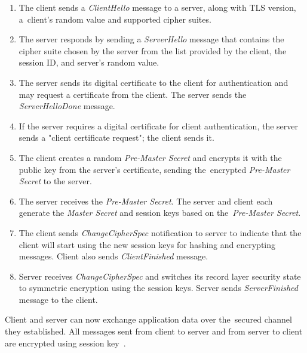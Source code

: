 \documentclass[
  oneside, 12pt, 
  printed, %
  notable,   %
  nolof,     %
  nolot,     %
]{fithesis3}
\begin{document}
\begin{enumerate}
\item The client sends a \textit{ClientHello} message to a server, along with TLS version, a~client's random value and supported cipher suites.
\item The server responds by sending a \textit{ServerHello} message that contains the cipher suite chosen by the server from the list provided by the client, the session ID, and server's random value. 
\item The server sends its digital certificate to the client for authentication and may request a certificate from the client. The server sends the \textit{ServerHelloDone} message.
\item If the server requires a digital certificate for client authentication, the server sends a "client certificate request"; the client sends it.
\item The client creates a random \textit{Pre-Master Secret} and encrypts it with the public key from the server's certificate, sending the~encrypted \textit{Pre-Master Secret} to the server.
\item The server receives the \textit{Pre-Master Secret}. The server and client each generate the \textit{Master Secret} and session keys based on the~\textit{Pre-Master Secret}.
\item The client sends \textit{ChangeCipherSpec} notification to server to indicate that the client will start using the new session keys for hashing and encrypting messages. Client also sends \textit{ClientFinished} message.
\item Server receives \textit{ChangeCipherSpec} and switches its record layer security state to symmetric encryption using the session keys. Server sends \textit{ServerFinished} message to the client.
\end{enumerate}

Client and server can now exchange application data over the~secured channel they established. All 
messages sent from client to server and from server to client are encrypted using session 
key~\cite{ibm, handshakeprotocol}.
\end{document}

